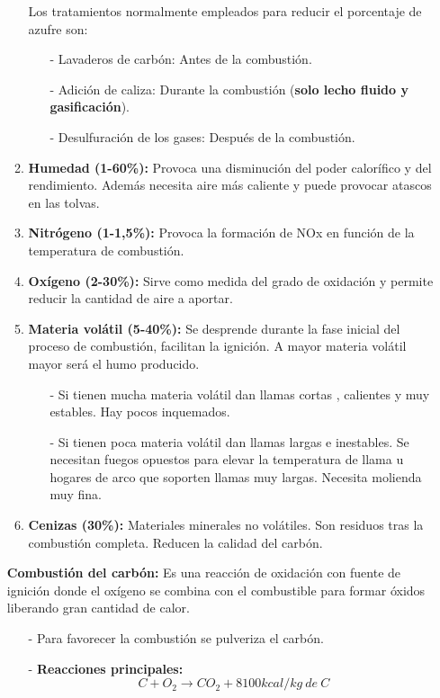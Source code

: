 \begin{enumerate}
\begin{enumerate}
				
				Los tratamientos normalmente empleados para reducir el porcentaje de azufre son:
				\begin{itemize}
					\item [-] Lavaderos de carbón: Antes de la combustión.
					\item [-] Adición de caliza: Durante la combustión (\textbf{solo lecho fluido y gasificación}).
					\item [-] Desulfuración de los gases: Después de la combustión.
				\end{itemize}
			\item \textbf{Humedad (1-60\%):}
				Provoca una disminución del poder calorífico y del rendimiento. Además necesita aire más caliente y puede provocar atascos en las tolvas.
			\item \textbf{Nitrógeno (1-1,5\%):}
				Provoca la formación de NOx en función de la temperatura de combustión.
			\item \textbf{Oxígeno (2-30\%):}
				Sirve como medida del grado de oxidación y permite reducir la cantidad de aire a aportar.
				\newpage
			\item \textbf{Materia volátil (5-40\%):}
				Se desprende durante la fase inicial del proceso de combustión, facilitan la ignición. A mayor materia volátil mayor será el humo producido.
				\begin{itemize}
					\item [-] Si tienen mucha materia volátil dan llamas cortas , calientes y muy estables. Hay pocos inquemados.
					\item [-] Si tienen poca materia volátil dan llamas largas e inestables. Se necesitan fuegos opuestos para elevar la temperatura de llama u hogares de arco que
					soporten llamas muy largas. Necesita molienda muy fina.
				\end{itemize}
			\item \textbf{Cenizas (30\%):}
				Materiales minerales no volátiles. Son residuos tras la combustión completa. Reducen la calidad del carbón.		
		\end{enumerate}
		\textbf{Combustión del carbón:} Es una reacción de oxidación con fuente de ignición donde el oxígeno se combina con el combustible para formar óxidos liberando gran cantidad de calor.
		\begin{itemize}
			\item [-] Para favorecer la combustión se pulveriza el carbón.
			\item [-] \textbf{Reacciones principales:}
			\[C+O_2\rightarrow CO_2 + 8100kcal/kg \ de \ C\]

\end{itemize}
\end{enumerate}
